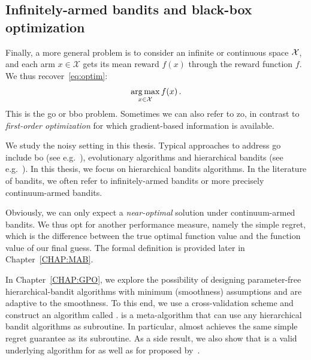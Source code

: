\subsection{Infinitely-armed bandits and black-box optimization}\label{sec:intro.mab.bbo}

Finally, a more general problem is to consider an infinite or continuous space $\mathcal{X}$, and each arm $x\in\mathcal{X}$ gets its mean reward $f(x)$ through the reward function $f$. We thus recover~\eqref{eq:optim}:
\[
    \operatorname*{arg\,max}_{x\in\mathcal{X}} f(x)\,.
\]
This is the \gls{go} or \gls{bbo} problem. Sometimes we can also refer to \gls{zo}, in contrast to \emph{first-order optimization} for which gradient-based information is available.

We study the noisy setting in this thesis. Typical approaches to address \gls{go} include \gls{bo} (see e.g.~\citealt{brochu2010bayesian}), evolutionary algorithms and hierarchical bandits (see e.g.~\citealt{bubeck2010x}). In this thesis, we focus on hierarchical bandits algorithms. In the literature of bandits, we often refer to \gls{infinitely-armed bandits} or more precisely \gls{continuum-armed bandits}.

Obviously, we can only expect a \emph{near-optimal} solution under continuum-armed bandits. We thus opt for another performance measure, namely the \gls{simple regret}, which is the difference between the true optimal function value and the function value of our final guess. The formal definition is provided later in Chapter~\ref{CHAP:MAB}.

In Chapter~\ref{CHAP:GPO}, we explore the possibility of designing parameter-free hierarchical-bandit algorithms with minimum (smoothness) assumptions and are adaptive to the smoothness. To this end, we use a cross-validation scheme and construct an algorithm called \GPO{}. \GPO{} is a meta-algorithm that can use any hierarchical bandit algorithms as subroutine. In particular, \GPO{} almost achieves the same simple regret guarantee as its subroutine. As a side result, we also show that \HCT{} is a valid underlying algorithm for \GPO{} as well as for \POO{} proposed by~\cite{grill2015poo}. 


